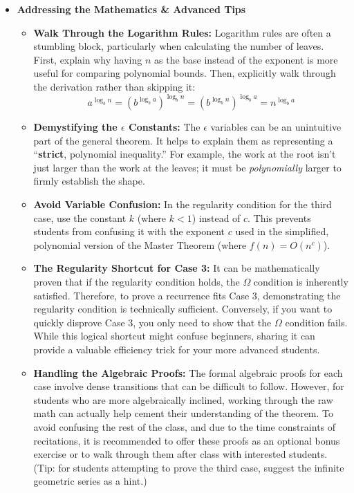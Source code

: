 \documentclass[11pt, a4paper]{article}
\begin{document}
\begin{itemize}
    \item \textbf{Addressing the Mathematics \& Advanced Tips}
    \begin{itemize}
        \item \textbf{Walk Through the Logarithm Rules:} Logarithm rules are often a stumbling block, particularly when calculating the number of leaves. First, explain why having $n$ as the base instead of the exponent is more useful for comparing polynomial bounds. Then, explicitly walk through the derivation rather than skipping it: 
        \[ a^{\log_b n} = (b^{\log_b a})^{\log_b n} = (b^{\log_b n})^{\log_b a} = n^{\log_b a} \]
        \item \textbf{Demystifying the $\epsilon$ Constants:} The $\epsilon$ variables can be an unintuitive part of the general theorem. It helps to explain them as representing a ``\textbf{strict}, polynomial inequality.'' For example, the work at the root isn't just larger than the work at the leaves; it must be \textit{polynomially} larger to firmly establish the shape.
        \item \textbf{Avoid Variable Confusion:} In the regularity condition for the third case, use the constant $k$ (where $k < 1$) instead of $c$. This prevents students from confusing it with the exponent $c$ used in the simplified, polynomial version of the Master Theorem (where $f(n) = O(n^c)$).
        \item \textbf{The Regularity Shortcut for Case 3:} It can be mathematically proven that if the regularity condition holds, the $\Omega$ condition is inherently satisfied. Therefore, to prove a recurrence fits Case 3, demonstrating the regularity condition is technically sufficient. Conversely, if you want to quickly disprove Case 3, you only need to show that the $\Omega$ condition fails. While this logical shortcut might confuse beginners, sharing it can provide a valuable efficiency trick for your more advanced students.
        \item \textbf{Handling the Algebraic Proofs:} The formal algebraic proofs for each case involve dense transitions that can be difficult to follow. However, for students who are more algebraically inclined, working through the raw math can actually help cement their understanding of the theorem. To avoid confusing the rest of the class, and due to the time constraints of recitations, it is recommended to offer these proofs as an optional bonus exercise or to walk through them after class with interested students. (Tip: for students attempting to prove the third case, suggest the infinite geometric series as a hint.)
    \end{itemize}

\end{itemize}
\end{document}
